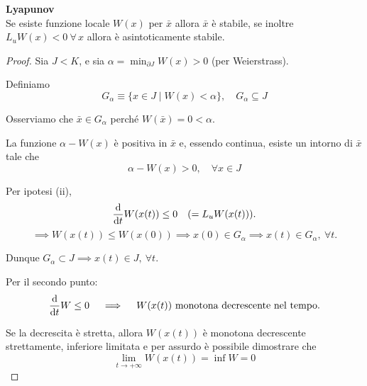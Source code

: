 \begin{theorem}
    \textbf{Lyapunov}\\
    Se esiste funzione locale $W(x)$ per $\bar{x}$ allora $ \bar{x}$ è stabile,
    se inoltre $L_uW(x)<0\ \forall\,x$ allora è asintoticamente stabile.
\end{theorem}
\begin{proof}
Sia $J < K$, e sia $\alpha = \min_{\partial J} W(x) > 0$ (per Weierstrass).  

Definiamo
\begin{equation*}
    G_\alpha \equiv \{ x \in J \mid W(x) < \alpha \}, \quad G_\alpha \subseteq J
\end{equation*}

Osserviamo che $\bar{x} \in G_\alpha$ perché $W(\bar{x}) = 0 < \alpha$.  

La funzione $\alpha - W(x)$ è positiva in $\bar{x}$ e, essendo continua, esiste un intorno di $\bar{x}$ tale che
\begin{equation*}
    \alpha - W(x) > 0, \quad \forall x \in J
\end{equation*}

Per ipotesi (ii),
\begin{equation*}
    \dv{t} W(x(t)) \leq 0 \quad (= L_u W(x(t))).
\end{equation*}
\begin{equation*}
   \implies W(x(t)) \leq W(x(0)) \implies x(0) \in G_\alpha \implies x(t) \in G_\alpha, \ \forall t.
\end{equation*}

Dunque $G_\alpha \subset J \implies x(t) \in J, \ \forall t$.  

Per il secondo punto:  
\begin{equation*}
    \dv{t} W \leq 0 \quad \implies \quad W(x(t)) \ \text{monotona decrescente nel tempo}.
\end{equation*}

Se la decrescita è stretta, allora $W(x(t))$ è monotona decrescente strettamente, inferiore limitata e per assurdo è possibile dimostrare che
\begin{equation*}
    \lim_{t \to +\infty} W(x(t)) = \inf W = 0
\end{equation*}
\end{proof}


